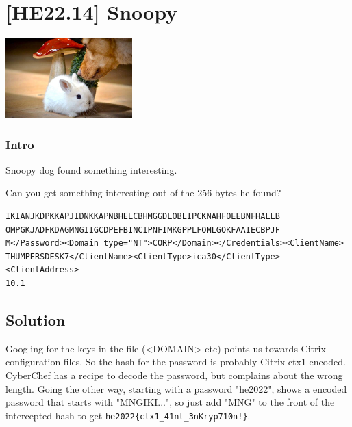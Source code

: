 
\hypertarget{he22.14}{%
\chapter{[HE22.14] Snoopy}\label{he22.14}}

\begin{marginfigure}
	\includegraphics[width=49mm]{level4/challenge14.jpg}
\end{marginfigure}
\subsection{Intro}
Snoopy dog found something interesting.

\noindent
Can you get something interesting out of the 256 bytes he found?

\noindent\begin{verbatim}
IKIANJKDPKKAPJIDNKKAPNBHELCBHMGGDLOBLIPCKNAHFOEEBNFHALLB
OMPGKJADFKDAGMNGIIGCDPEFBINCIPNFIMKGPPLFOMLGOKFAAIECBPJF
M</Password><Domain type="NT">CORP</Domain></Credentials><ClientName>
THUMPERSDESK7</ClientName><ClientType>ica30</ClientType><ClientAddress>
10.1  
\end{verbatim}

\section{Solution}\label{hv22.14solution}
Googling for the keys in the file (<DOMAIN> etc) points us towards Citrix 
configuration files.  So the hash for the password is probably Citrix ctx1 
encoded.  \href{https://cyberchef.org/}{CyberChef} has a recipe to decode 
the password, but complains about the wrong length.  Going the other way, 
starting with a password "he2022", shows a encoded password that starts 
with "MNGIKI...", so just add "MNG" to the front of the intercepted hash to 
get
\verb+he2022{ctx1_41nt_3nKryp710n!}+.




